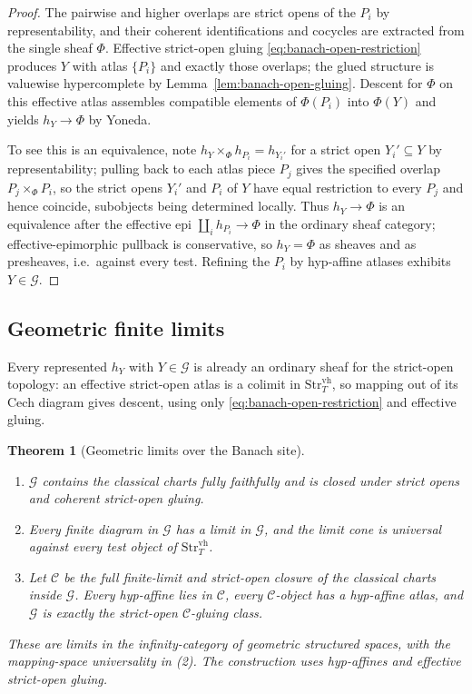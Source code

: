 \documentclass[12pt]{amsart}
\newtheorem{thm}{Theorem}[section]
\theoremstyle{definition}
\theoremstyle{remark}
\numberwithin{equation}{section}
\begin{document}
\begin{proof}
The pairwise and higher overlaps are strict opens of the $P_i$ by
representability, and their coherent identifications and cocycles are
extracted from the single sheaf $\Phi$. Effective strict-open gluing
\eqref{eq:banach-open-restriction} produces $Y$ with atlas $\{P_i\}$
and exactly those overlaps; the glued structure is valuewise
hypercomplete by Lemma~\ref{lem:banach-open-gluing}. Descent for
$\Phi$ on this effective atlas assembles compatible elements of
$\Phi(P_i)$ into $\Phi(Y)$ and yields $h_Y\to\Phi$ by Yoneda.

To see this is an equivalence, note $h_Y\times_\Phi h_{P_i}=h_{Y_i'}$
for a strict open $Y_i'\subseteq Y$ by representability; pulling back
to each atlas piece $P_j$ gives the specified overlap
$P_j\times_\Phi P_i$, so the strict opens $Y_i'$ and $P_i$ of $Y$
have equal restriction to every $P_j$ and hence coincide, subobjects
being determined locally. Thus $h_Y\to\Phi$ is an equivalence after
the effective epi $\coprod_i h_{P_i}\to\Phi$ in the ordinary sheaf
category; effective-epimorphic pullback is conservative, so
$h_Y=\Phi$ as sheaves and as presheaves, i.e.\ against every test.
Refining the $P_i$ by hyp-affine atlases exhibits $Y\in\mathcal G$.
\end{proof}

\subsection{Geometric finite limits}
\label{subsec:banach-g1}

Every represented $h_Y$ with $Y\in\mathcal G$ is already an ordinary
sheaf for the strict-open topology: an effective strict-open atlas
is a colimit in $\mathrm{Str}_T^{\mathrm{vh}}$, so mapping out of its
Cech diagram gives descent, using only
\eqref{eq:banach-open-restriction} and effective gluing.

\begin{thm}[Geometric limits over the Banach site]
\label{thm:banach-geometric-limits}
\ \begin{enumerate}
\item $\mathcal G$ contains the classical charts fully faithfully and
is closed under strict opens and coherent strict-open gluing.
\item Every finite diagram in $\mathcal G$ has a limit in
$\mathcal G$, and the limit cone is universal against every test
object of $\mathrm{Str}_T^{\mathrm{vh}}$.
\item Let $\mathcal C$ be the full finite-limit and strict-open
closure of the classical charts inside $\mathcal G$. Every
hyp-affine lies in $\mathcal C$, every $\mathcal C$-object has a
hyp-affine atlas, and $\mathcal G$ is exactly the strict-open
$\mathcal C$-gluing class.
\end{enumerate}
These are limits in the infinity-category of geometric structured
spaces, with the mapping-space universality in \textup{(2)}.
The construction uses hyp-affines and effective strict-open gluing.
\end{thm}
\end{document}
